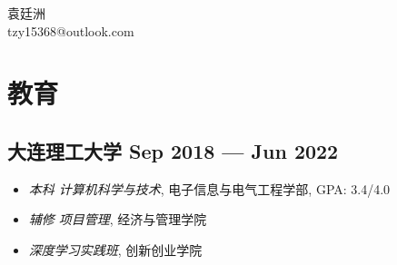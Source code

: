 \documentclass[a4,12pt]{article}
\newcommand{\subtext}[1]{
#1\par\vspace{-0.3cm}}
\newenvironment{zitemize}{
\begin{itemize}\itemsep0pt \parskip0pt \parsep1pt}
{\end{itemize}\vspace{-0.5cm}}
\newcommand{\hskills}[1]{
\textbf{\bfseries #1} }
\begin{document}
\begin{center}
    \begin{minipage}[b]{0.5\textwidth}
            \centering
            {\huge 袁廷洲} \\ %
            \vspace{0.1cm}
            tzy15368@outlook.com
    \end{minipage}%
    
\vspace{-0.35cm} 
\end{center}

\section{\textbf{教育}}
\subsection*{大连理工大学 \hfill \textbf{Sep 2018 --- Jun 2022}}
\begin{zitemize}
    \item
        \subtext{\textit{本科 计算机科学与技术}, 电子信息与电气工程学部, GPA: 3.4/4.0}
        \vspace{0.15cm}
    \item
        \subtext{\textit{辅修 项目管理}, 经济与管理学院}
        \vspace{0.15cm}
    \item
        \subtext{\textit{深度学习实践班}, 创新创业学院}
        \vspace{0.15cm}
        
\end{zitemize}
\end{document}
